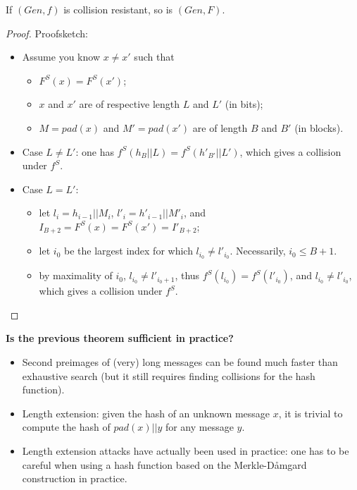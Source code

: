 	\begin{theorem}
	    If $(Gen,f)$ is collision resistant, so is $(Gen,F)$.
	\end{theorem}
	\begin{proof}
		Proofsketch:
		\begin{itemize}
			\item Assume you know $x \neq x'$ such that
			\begin{itemize}
				\item $F^S(x) = F^S(x')$;
				\item $x$ and $x'$ are of respective length $L$ and $L'$ (in bits);
				\item $M = pad(x)$ and $M' = pad(x')$ are of length $B$ and $B'$ (in blocks). 
			\end{itemize}
			\item Case $L \neq L'$: one has $f^S(h_B||L) = f^S(h'_{B'}||L')$, which gives a collision under $f^S$.
			\item Case $L=L'$:
			\begin{itemize}
				\item let $l_i = h_{i-1}||M_i$, $l'_i = h'_{i-1}||M'_i$, and $I_{B+2} = F^S(x) = F^S(x') = I'_{B+2}$;
				\item let $i_0$ be the largest index for which $l_{i_0} \neq l'_{i_0}$.
				Necessarily, $i_0 \leq B+1$.
				\item by maximality of $i_0$, $l_{i_0} \neq l'_{i_0 +1}$, thus $f^S(l_{i_0}) = f^S(l'_{i_0})$, and $l_{i_0} \neq l'_{i_0}$,
				which gives a collision under $f^S$.
			\end{itemize}
		\end{itemize}
	\end{proof}
	
	\textbf{Is the previous theorem sufficient in practice?}
	\begin{itemize}
		\item Second preimages of (very) long messages can be found much faster than exhaustive search (but it still requires finding collisions for the hash function).
		\item Length extension: given the hash of an unknown message $x$, it is trivial to compute the hash of $pad(x)||y$ for any message $y$.
		\item Length extension attacks have actually been used in practice: one has to be careful when using a hash function based on the Merkle-Dåmgard construction in practice.
	\end{itemize}

